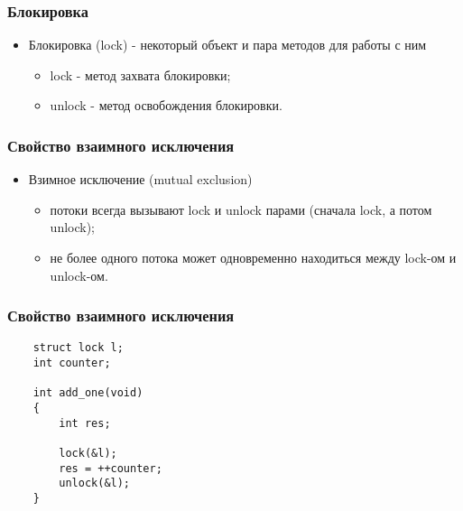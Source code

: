 \begin{frame}
\frametitle{Блокировка}
\begin{itemize}
    \item<1->Блокировка (lock) - некоторый объект и пара методов для работы с
         ним
    \begin{itemize}
        \item<2->lock - метод захвата блокировки;
        \item<3->unlock - метод освобождения блокировки.
    \end{itemize}
\end{itemize}
\end{frame}

\begin{frame}
\frametitle{Свойство взаимного исключения}
\begin{itemize}
    \item<1->Взимное исключение (mutual exclusion)
    \begin{itemize}
        \item<2->потоки всегда вызывают lock и unlock парами (сначала lock,
             а потом unlock);
        \item<3->не более одного потока может одновременно находиться между
             lock-ом и unlock-ом.
    \end{itemize}
\end{itemize}
\end{frame}

\begin{frame}[fragile]
\frametitle{Свойство взаимного исключения}
\begin{lstlisting}
    struct lock l;
    int counter;

    int add_one(void)
    {
        int res;

        lock(&l);
        res = ++counter;
        unlock(&l);
    }
\end{lstlisting}
\end{frame}

